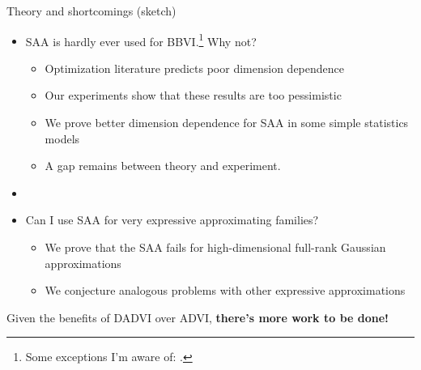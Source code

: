 \documentclass[8pt]{beamer}\usepackage[]{graphicx}\usepackage[]{color}
\begin{document}
\begin{frame}{Theory and shortcomings (sketch)}
    \begin{itemize}
        \item SAA is hardly ever used for BBVI.\footnote{Some exceptions I'm
        aware of:
        \citet{giordano:2018:covariances,giordano:2022:bnp,wycoff:2022:sparsebayesianlasso,burroni:2023:saabbvi}.}
        Why not?
        \begin{itemize}
            \item Optimization literature predicts poor
            dimension dependence \citep{nemirovski:2009:sgdvsfixed}
            \item Our experiments show that these results are too pessimistic
            \item We prove better dimension dependence for SAA in some
            simple statistics models
            \item A gap remains between theory and experiment.
        \end{itemize}
        \pause
        \item[]
        \item Can I use SAA for very expressive approximating families?
        \begin{itemize}
            \item We prove that the SAA fails for high-dimensional full-rank
                Gaussian approximations
            \item We conjecture analogous problems with other 
                expressive approximations
        \end{itemize}
    \end{itemize}

    \vspace{1em}
    Given the benefits of DADVI over ADVI,
    \textbf{there's more work to be done!}
\end{frame}


\end{document}
